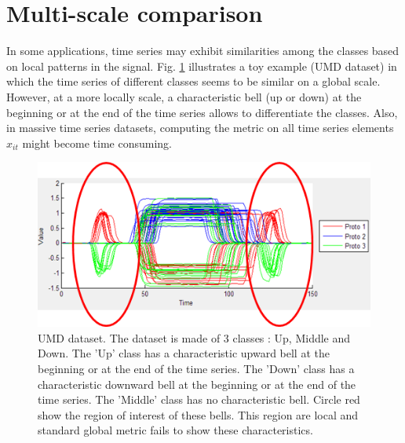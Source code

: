 

\section{Multi-scale comparison}

In some applications, time series may exhibit similarities among the classes based on local patterns in the signal. Fig. \ref{fig:UMD} illustrates a toy example (UMD dataset) in which the time series of different classes seems to be similar on a global scale. However, at a more locally scale, a characteristic bell (up or down) at the beginning or at the end of the time series allows to differentiate the classes. Also, in massive time series datasets, computing the metric on all time series elements $x_{it}$ might become time consuming.

\begin{figure}[h!]
	\centering
	\includegraphics[width=0.6\linewidth]{images/UMD}
	\caption{UMD dataset. The dataset is made of 3 classes : Up, Middle and Down. The 'Up' class has a characteristic upward bell at the beginning or at the end of the time series. The 'Down' class has a characteristic downward bell at the beginning or at the end of the time series. The 'Middle' class has no characteristic bell. Circle red show the region of interest of these bells. This region are local and standard global metric fails to show these characteristics.}
	\label{fig:UMD}
\end{figure}

